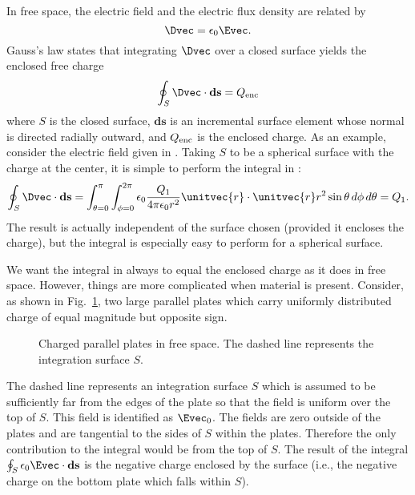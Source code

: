In free space, the electric field and the electric flux density are
related by
\begin{equation}
  \Dvec = \epsilon_0\Evec.
\end{equation}
Gauss's law states that
integrating $\Dvec$ over a closed surface yields the enclosed free
charge
\begin{equation}
  \oint_S \Dvec\cdot \mathbf{ds} = Q_{\mbox{\scriptsize enc}}
  \label{eq:gauss}
\end{equation}
where $S$ is the closed surface, $\mathbf{ds}$ is an incremental
surface element whose normal is directed radially outward, and
$Q_{\mbox{\scriptsize enc}}$ is the enclosed charge.  As an example,
consider the electric field given in .  Taking $S$ to
be a spherical surface with the charge at the center, it is simple to
perform the integral in :
\begin{equation}
  \oint_S \Dvec\cdot \mathbf{ds} =
  \int_{\theta=0}^\pi\int_{\phi=0}^{2\pi}
    \epsilon_0 \frac{Q_1}{4 \pi\epsilon_0 r^2}\unitvec{r} \cdot
    \unitvec{r} r^2\sin\theta \, d\phi \, d\theta = Q_1.
  \label{eq:gaussExamp}
\end{equation}
The result is actually independent of the surface chosen (provided it
encloses the charge), but the integral is especially easy to perform
for a spherical surface.

We want the integral in  always to equal the enclosed
charge as it does in free space.  However, things are more complicated
when material is present.  Consider, as shown in Fig.\
\ref{fig:platesFree}, two large parallel plates which carry uniformly
distributed charge of equal magnitude but opposite sign.  
\begin{figure}
  \begin{center}
  \end{center}
  \caption{Charged parallel plates in free space.  The dashed line
  represents the integration surface $S$.}
  \label{fig:platesFree}
\end{figure}
The dashed line represents an integration surface $S$ which is assumed
to be sufficiently far from the edges of the plate so that the field
is uniform over the top of $S$.  This field is identified as
$\Evec_0$.  The fields are zero outside of the plates and are
tangential to the sides of $S$ within the plates.  Therefore the only
contribution to the integral would be from the top of $S$.  The result
of the integral $\oint_S \epsilon_0\Evec\cdot \mathbf{ds}$ 
is the negative charge enclosed by the surface (i.e., the negative
charge on the bottom plate which falls within $S$).

